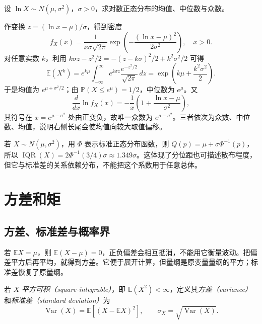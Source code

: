 \begin{example}
\label{ex:study-lognormal-location}
设 $\ln X\sim N(\mu,\sigma^2)$，$\sigma>0$，求对数正态分布的均值、中位数与众数。
\end{example}

\begin{solve}
作变换 $z=(\ln x-\mu)/\sigma$，得到密度
\[
  f_X(x)=\frac1{x\sigma\sqrt{2\pi}}
    \exp\left(-\frac{(\ln x-\mu)^2}{2\sigma^2}\right),\quad x>0.
\]
对任意实数 $k$，利用 $k\sigma z-z^2/2=-(z-k\sigma)^2/2+k^2\sigma^2/2$ 可得
\begin{equation}
  \mathbb E(X^k)
    =e^{k\mu}\int_{-\infty}^{\infty}e^{k\sigma z}
       \frac{e^{-z^2/2}}{\sqrt{2\pi}}\,dz
    =\exp\left(k\mu+\frac{k^2\sigma^2}{2}\right).
  \label{eq:study-lognormal-moments}
\end{equation}
于是均值为 $e^{\mu+\sigma^2/2}$；由 $\mathbb P(X\le e^\mu)=1/2$，中位数为 $e^\mu$。又
\[
  \frac{d}{dx}\ln f_X(x)
    =-\frac1x\left(1+\frac{\ln x-\mu}{\sigma^2}\right),
\]
其符号在 $x=e^{\mu-\sigma^2}$ 处由正变负，故唯一众数为 $e^{\mu-\sigma^2}$。三者依次为众数、中位数、均值，说明右侧长尾会使均值向较大取值偏移。
\end{solve}

若 $X\sim N(\mu,\sigma^2)$，用 $\Phi$ 表示标准正态分布函数，则 $Q(p)=\mu+\sigma\Phi^{-1}(p)$，所以 $\operatorname{IQR}(X)=2\Phi^{-1}(3/4)\sigma\approx1.349\sigma$。这体现了分位距也可描述散布程度，但它与标准差的关系依赖分布，不能把这个系数用于任意总体。

\section{方差和矩}
\label{sec:study-variance-moments}

\subsection{方差、标准差与概率界}
\label{subsec:study-variance-inequalities}

若 $\mathbb E X=\mu$，则 $\mathbb E(X-\mu)=0$，正负偏差会相互抵消，不能用它衡量波动。把偏差平方后再平均，就得到方差。它便于展开计算，但量纲是原变量量纲的平方；标准差恢复了原量纲。

\begin{definition}
\label{def:study-variance}
若 $X$ \emph{平方可积（square-integrable）}，即 $\mathbb E(X^2)<\infty$，定义其\emph{方差（variance）}和\emph{标准差（standard deviation）}为
\begin{equation}
  \operatorname{Var}(X)=\mathbb E[(X-\mathbb E X)^2],\qquad
  \sigma_X=\sqrt{\operatorname{Var}(X)}.
  \label{eq:study-variance-definition}
\end{equation}
\end{definition}

